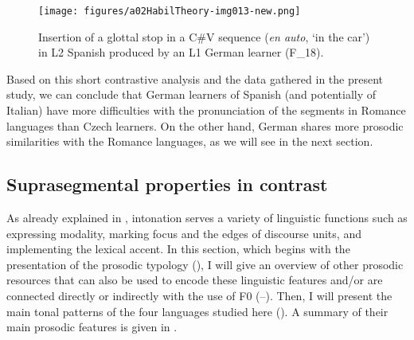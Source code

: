 \begin{figure}

\texttt{[image: figures/a02HabilTheory-img013-new.png]}



\caption{Insertion of a glottal stop in a C\#V sequence (\textit{en auto}, ‘in the car’) in L2 Spanish produced by an L1 German learner (F\_18).}
\label{fig:2.11}
\end{figure}

Based on this short contrastive analysis and the data gathered in the present study, we can conclude that German learners of Spanish (and potentially of Italian) have more difficulties with the pronunciation of the segments in Romance languages than Czech learners. On the other hand, German shares more prosodic similarities with the Romance languages, as we will see in the next section.

\subsection{Suprasegmental properties in contrast}\label{sec:2.3.2}

As already explained in , intonation serves a variety of linguistic functions such as expressing modality, marking focus and the edges of discourse units, and implementing the lexical accent. In this section, which begins with the presentation of the prosodic typology (), I will give an overview of other prosodic resources that can also be used to encode these linguistic features and/or are connected directly or indirectly with the use of F0 (--). Then, I will present the main tonal patterns of the four languages studied here (). A summary of their main prosodic features is given in .


